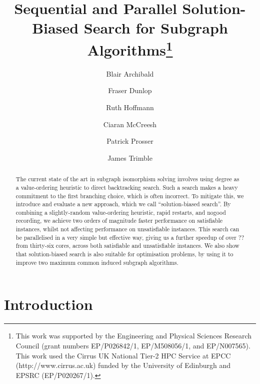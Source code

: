 \documentclass[runningheads]{llncs}
\begin{document}
\title{Sequential and Parallel Solution-Biased Search for Subgraph Algorithms\thanks{This work was
supported by the Engineering and Physical Sciences Research Council (grant numbers EP/P026842/1,
EP/M508056/1, and EP/N007565). This work used the Cirrus UK National Tier-2 HPC Service at EPCC
(http://www.cirrus.ac.uk) funded by the University of Edinburgh and EPSRC (EP/P020267/1).}}

\author{Blair Archibald\and
Fraser Dunlop\and
Ruth Hoffmann\and
Ciaran McCreesh\and
Patrick Prosser \and
James Trimble}



\maketitle

\begin{abstract}
    The current state of the art in subgraph isomorphism solving involves using degree as a
    value-ordering heuristic to direct backtracking search. Such a search makes a heavy commitment
    to the first branching choice, which is often incorrect. To mitigate this, we introduce and
    evaluate a new approach, which we call ``solution-biased search''. By combining a
    slightly-random value-ordering heuristic, rapid restarts, and nogood recording, we achieve two
    orders of magnitude faster performance on satisfiable instances, whilst not affecting
    performance on unsatisfiable instances. This search can be parallelised in a very simple
    but effective way, giving us a further speedup of over ?? from thirty-six cores, across both
    satisfiable and unsatisfiable instances.  We also show that solution-biased search is also
    suitable for optimisation problems, by using it to improve two maximum common induced subgraph
    algorithms.
\end{abstract}

\section{Introduction}
\end{document}
